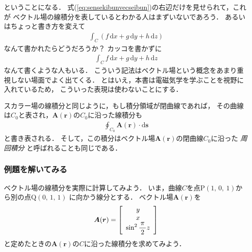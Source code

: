 ということになる．
式(\ref{eq:sensekibunvecseibun})の右辺だけを見せられて，これが
ベクトル場の線積分を表しているとわかる人はまずいないであろう．
あるいはちょっと書き方を変えて
\begin{align*}
\int_C ( f \, \mathrm{d} x + g \, \mathrm{d} y + h \, \mathrm{d}z )
\end{align*}
なんて書かれたらどうだろうか？ カッコを書かずに
\begin{align*}
\int_C f \, \mathrm{d} x + g \, \mathrm{d} y + h \, \mathrm{d}z
\end{align*}
なんて書くような人もいる．
こういう記法はベクトル場という概念をあまり重視しない場面でよく出てくる．
とはいえ，本書は電磁気学を学ぶことを視野に入れているため，
こういった表現は使わないことにする．

スカラー場の線積分と同じように，もし積分領域が閉曲線であれば，
その曲線は$C_0$と表され，$\bm{A}(\bm{r})$の$C_0$に沿った線積分も
\begin{align*}
\oint_{C_0} \bm{A} ( \bm{r} ) \cdot \mathrm{d} \bm{s} 
\end{align*}
と書き表される．
そして，この積分はベクトル場$\bm{A}(\bm{r})$の閉曲線$C_0$に沿った
\emph{周回積分}
と呼ばれることも同じである．

\subsubsection{例題を解いてみる}
ベクトル場の線積分を実際に計算してみよう．
いま，曲線$C$を点$\mathrm{P} ( 1,\, 0, \ 1)$から別の点$\mathrm{Q}(0, \, 1, \, 1 )$
に向かう線分とする．
ベクトル場$\bm{A} (\bm{r})$を
\begin{align*}
\bm{A} (\bm{r}) = \left[
\renewcommand{\arraystretch}{1}
\begin{array}{c}
y \\
x \\
\displaystyle \sin^2 \frac{\pi}{2} z
\end{array}
\right]
\end{align*}
と定めたときの$\bm{A}(\bm{r})$の$C$に沿った線積分を求めてみよう．

